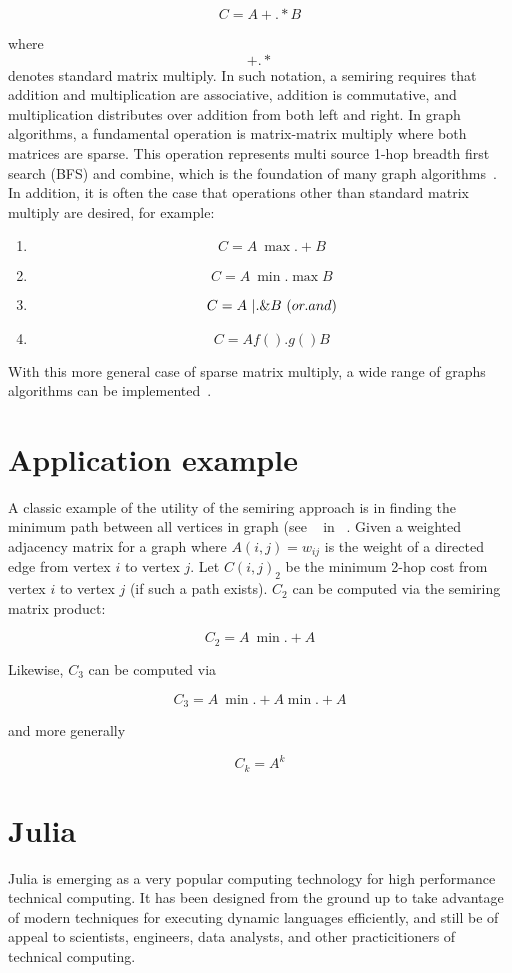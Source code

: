 \documentclass[conference]{IEEEtran}
\begin{document}
$$C = A +.* B$$

where $$+.*$$ denotes standard matrix multiply.  In such notation, a
semiring requires that addition and multiplication are associative,
addition is commutative, and multiplication distributes over addition
from both left and right.  In graph algorithms, a fundamental
operation is matrix-matrix multiply where both matrices are sparse.
This operation represents multi source 1-hop breadth first search
(BFS) and combine, which is the foundation of many graph
algorithms~\cite{shahgilbert}.  In addition, it is often the case that
operations other than standard matrix multiply are desired, for
example:

\begin{enumerate}
\item $$C = A \ {\max.+} B$$
\item $$C = A \ \min.\max B$$
\item $$C = A \ |.\& B \ ({\mbox or.and})$$
\item $$C = A f().g() B $$
\end{enumerate}

With this more general case of sparse matrix multiply, a wide range of graphs algorithms can be implemented~\cite{KepnerGilbertBook}.

\section{Application example}

A classic example of the utility of the semiring approach is in
finding the minimum path between all vertices in graph (see
~\cite{Rader} in ~\cite{KepnerGilbertBook}.  Given a weighted
adjacency matrix for a graph where $A(i,j) = w_{ij}$ is the weight of
a directed edge from vertex $i$ to vertex $j$.  Let $C(i,j)_2$ be the
minimum 2-hop cost from vertex $i$ to vertex $j$ (if such a path
exists).  $C_2$ can be computed via the semiring matrix product:

$$C_2 = A \ \min.+ A$$

Likewise, $C_3$ can be computed via

$$C_3 = A\  \min.+ A \min.+ A$$

and more generally

$$C_k = A^k$$

\section{Julia}

Julia is emerging as a very popular computing technology for high performance
technical computing.  It has been designed from the ground up to take advantage
of modern techniques for executing dynamic languages efficiently, and still
be of appeal to scientists, engineers, data analysts, and other
practicitioners of technical computing\cite{julia}.
\end{document}
